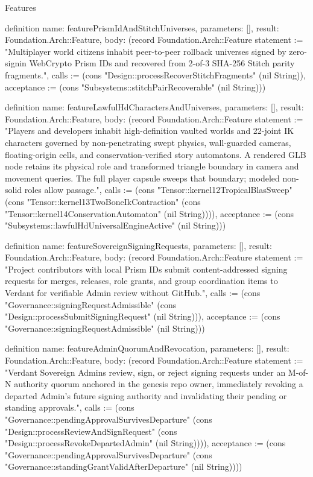 \begin{lexlean}{Features}
\begin{semanticmodule}
definition{
  name: featurePrismIdAndStitchUniverses,
  parameters: [],
  result: Foundation.Arch::Feature,
  body: (record Foundation.Arch::Feature {statement := "Multiplayer world citizens inhabit peer-to-peer rollback universes signed by zero-signin WebCrypto Prism IDs and recovered from 2-of-3 SHA-256 Stitch parity fragments.", calls := (cons "Design::processRecoverStitchFragments" (nil String)), acceptance := (cons "Subsystems::stitchPairRecoverable" (nil String))})
}

definition{
  name: featureLawfulHdCharactersAndUniverses,
  parameters: [],
  result: Foundation.Arch::Feature,
  body: (record Foundation.Arch::Feature {statement := "Players and developers inhabit high-definition vaulted worlds and 22-joint IK characters governed by non-penetrating swept physics, wall-guarded cameras, floating-origin cells, and conservation-verified story automatons. A rendered GLB node retains its physical role and transformed triangle boundary in camera and movement queries. The full player capsule sweeps that boundary; modeled non-solid roles allow passage.", calls := (cons "Tensor::kernel12TropicalBlasSweep" (cons "Tensor::kernel13TwoBoneIkContraction" (cons "Tensor::kernel14ConservationAutomaton" (nil String)))), acceptance := (cons "Subsystems::lawfulHdUniversalEngineActive" (nil String))})
}

definition{
  name: featureSovereignSigningRequests,
  parameters: [],
  result: Foundation.Arch::Feature,
  body: (record Foundation.Arch::Feature {statement := "Project contributors with local Prism IDs submit content-addressed signing requests for merges, releases, role grants, and group coordination items to Verdant for verifiable Admin review without GitHub.", calls := (cons "Governance::signingRequestAdmissible" (cons "Design::processSubmitSigningRequest" (nil String))), acceptance := (cons "Governance::signingRequestAdmissible" (nil String))})
}

definition{
  name: featureAdminQuorumAndRevocation,
  parameters: [],
  result: Foundation.Arch::Feature,
  body: (record Foundation.Arch::Feature {statement := "Verdant Sovereign Admins review, sign, or reject signing requests under an M-of-N authority quorum anchored in the genesis repo owner, immediately revoking a departed Admin's future signing authority and invalidating their pending or standing approvals.", calls := (cons "Governance::pendingApprovalSurvivesDeparture" (cons "Design::processReviewAndSignRequest" (cons "Design::processRevokeDepartedAdmin" (nil String)))), acceptance := (cons "Governance::pendingApprovalSurvivesDeparture" (cons "Governance::standingGrantValidAfterDeparture" (nil String)))})
}


\end{semanticmodule}
\end{lexlean}
